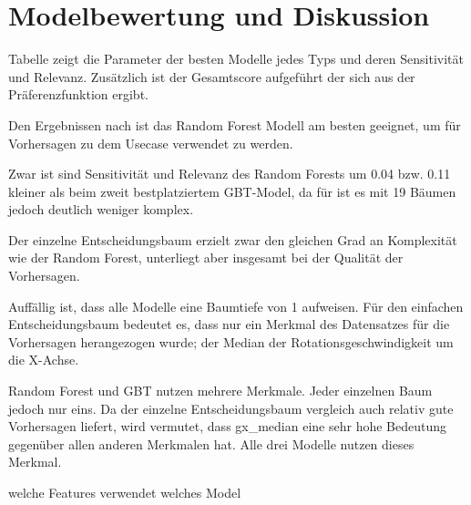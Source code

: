 \chapter{Modelbewertung und Diskussion}
\label{ch:modelbewertung}
Tabelle  zeigt die Parameter der besten Modelle jedes Typs und deren Sensitivität und Relevanz. Zusätzlich ist der Gesamtscore aufgeführt der sich aus der Präferenzfunktion ergibt.



Den Ergebnissen nach ist das Random Forest Modell am besten geeignet, um für Vorhersagen zu dem Usecase verwendet zu werden. 

Zwar ist sind Sensitivität und Relevanz des Random Forests um \num{0,04} bzw. \num{0,11} kleiner als beim zweit bestplatziertem GBT-Model, da für ist es mit 19 Bäumen jedoch deutlich weniger komplex.

Der einzelne Entscheidungsbaum erzielt zwar den gleichen Grad an Komplexität wie der Random Forest, unterliegt aber insgesamt bei der Qualität der Vorhersagen.

Auffällig ist, dass alle Modelle eine Baumtiefe von \num{1} aufweisen. Für den einfachen Entscheidungsbaum bedeutet es, dass nur ein Merkmal des Datensatzes für die Vorhersagen herangezogen wurde; der Median der Rotationsgeschwindigkeit um die X-Achse. 

Random Forest und GBT nutzen mehrere Merkmale. Jeder einzelnen Baum jedoch nur eins. Da der einzelne Entscheidungsbaum vergleich auch relativ gute Vorhersagen liefert, wird vermutet, dass gx\_median eine sehr hohe Bedeutung gegenüber allen anderen Merkmalen hat. Alle drei Modelle nutzen dieses Merkmal.



welche Features verwendet welches Model